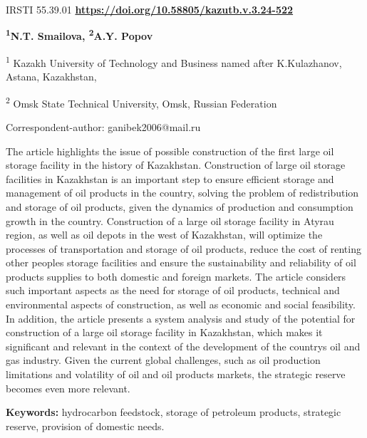 \newpage
IRSTI 55.39.01
\hfill {\bfseries \href{https://doi.org/10.58805/kazutb.v.3.24-522}{https://doi.org/10.58805/kazutb.v.3.24-522}}


\begin{center}
{\bfseries \textsuperscript{1}N.T. Smailova\envelope, \textsuperscript{2}A.Y. Popov}

\textsuperscript{1} Kazakh University of Technology and Business named
after K.Kulazhanov, Astana, Kazakhstan,

\textsuperscript{2} Omsk State Technical University, Omsk, Russian
Federation
\end{center}
\envelope Correspondent-author: ganibek2006@mail.ru


The article highlights the issue of possible construction of the first
large oil storage facility in the history of Kazakhstan. Construction of
large oil storage facilities in Kazakhstan is an important step to
ensure efficient storage and management of oil products in the country,
solving the problem of redistribution and storage of oil products, given
the dynamics of production and consumption growth in the country.
Construction of a large oil storage facility in Atyrau region, as well
as oil depots in the west of Kazakhstan, will optimize the processes of
transportation and storage of oil products, reduce the cost of renting
other people\textquotesingle s storage facilities and ensure the
sustainability and reliability of oil products supplies to both domestic
and foreign markets. The article considers such important aspects as the
need for storage of oil products, technical and environmental aspects of
construction, as well as economic and social feasibility. In addition,
the article presents a system analysis and study of the potential for
construction of a large oil storage facility in Kazakhstan, which makes
it significant and relevant in the context of the development of the
country\textquotesingle s oil and gas industry. Given the current global
challenges, such as oil production limitations and volatility of oil and
oil products markets, the strategic reserve becomes even more relevant.

{\bfseries Keywords:} hydrocarbon feedstock, storage of petroleum
products, strategic reserve, provision of domestic needs.


